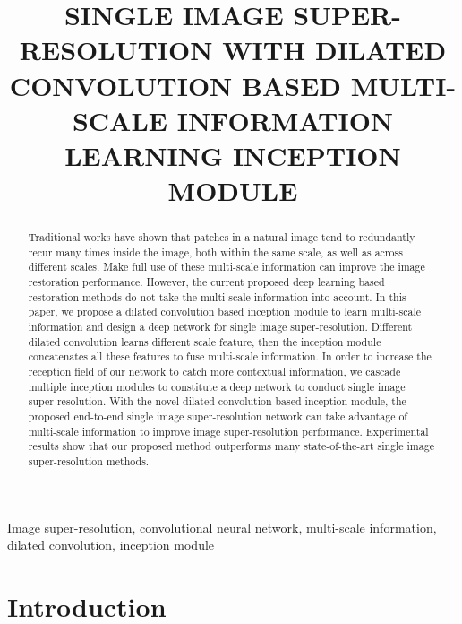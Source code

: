 \documentclass{article}
\title{SINGLE IMAGE SUPER-RESOLUTION WITH DILATED CONVOLUTION BASED MULTI-SCALE INFORMATION LEARNING INCEPTION MODULE}
\begin{document}
%
\maketitle
%
\begin{abstract}
Traditional works have shown that patches in a natural image tend to redundantly recur many times inside the image, both within the same scale, as well as across different scales. Make full use of these multi-scale information can improve the image restoration performance. However, the current proposed deep learning based restoration methods do not take the multi-scale information into account. In this paper, we propose a dilated convolution based inception module to learn multi-scale information and design a deep network for single image super-resolution. Different dilated convolution learns different scale feature, then the inception module concatenates all these features to fuse multi-scale information. In order to increase the reception field of our network to catch more contextual information, we cascade multiple inception modules to constitute a deep network to conduct single image super-resolution. With the novel dilated convolution based inception module, the proposed end-to-end single image super-resolution network can take advantage of multi-scale information to improve image super-resolution performance. Experimental results show that our proposed method outperforms many state-of-the-art single image super-resolution methods.
\end{abstract}
%
\begin{keywords}
Image super-resolution, convolutional neural network, multi-scale information, dilated convolution, inception module
\end{keywords}
%
\section{Introduction}
\label{sec:intro}
\end{document}
